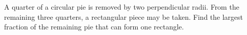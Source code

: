 A quarter of a circular pie is removed by two perpendicular radii. From the remaining three quarters, a rectangular piece may be taken. Find the largest fraction of the remaining pie that can form one rectangle.
